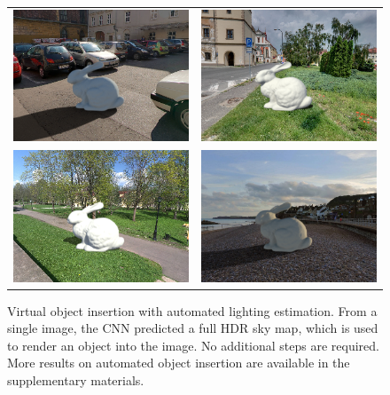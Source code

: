 \begin{figure}[!th]
    \centering
    \footnotesize
    \setlength{\tabcolsep}{1pt}
    \begin{tabular}{cc}
    \includegraphics[width=.47\linewidth]{./figures/renders/netout/pano_aaafspbtffjzbn_jpg-1_png_out.png} &
    \includegraphics[width=.47\linewidth]{./figures/renders/netout/pano_abauwcbvavypmw_jpg-2_png_out.png} \\
    \includegraphics[width=.47\linewidth]{./figures/renders/netout/pano_ajmdcorvpbtdcb_jpg-3_png_out.png} &
    \includegraphics[width=.47\linewidth]{./figures/renders/netout/pano_ajwnburtukssxf_jpg-5_png_out.png}
    \end{tabular}
    \caption[Virtual object insertion with authomated lighting estimation]{Virtual object insertion with automated lighting estimation. From a single image, the CNN predicted a full HDR sky map, which is used to render an object into the image. No additional steps are required. More results on automated object insertion are available in the supplementary materials.}
    \label{fig:evaluation_render_examples}
\end{figure}

